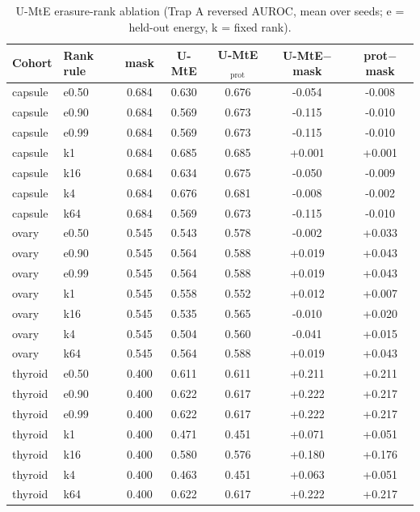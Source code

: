 \begin{table}[H]\centering\scriptsize
\caption{U-MtE erasure-rank ablation (Trap A reversed AUROC, mean over seeds; e = held-out energy, k = fixed rank).}\label{tab:abl}
\begin{tabular}{llccccc}\toprule
Cohort & Rank rule & mask & U-MtE & U-MtE$_{\text{prot}}$ & U-MtE$-$mask & prot$-$mask \\\midrule
capsule & e0.50 & 0.684 & 0.630 & 0.676 & -0.054 & -0.008 \\
capsule & e0.90 & 0.684 & 0.569 & 0.673 & -0.115 & -0.010 \\
capsule & e0.99 & 0.684 & 0.569 & 0.673 & -0.115 & -0.010 \\
capsule & k1 & 0.684 & 0.685 & 0.685 & +0.001 & +0.001 \\
capsule & k16 & 0.684 & 0.634 & 0.675 & -0.050 & -0.009 \\
capsule & k4 & 0.684 & 0.676 & 0.681 & -0.008 & -0.002 \\
capsule & k64 & 0.684 & 0.569 & 0.673 & -0.115 & -0.010 \\
ovary & e0.50 & 0.545 & 0.543 & 0.578 & -0.002 & +0.033 \\
ovary & e0.90 & 0.545 & 0.564 & 0.588 & +0.019 & +0.043 \\
ovary & e0.99 & 0.545 & 0.564 & 0.588 & +0.019 & +0.043 \\
ovary & k1 & 0.545 & 0.558 & 0.552 & +0.012 & +0.007 \\
ovary & k16 & 0.545 & 0.535 & 0.565 & -0.010 & +0.020 \\
ovary & k4 & 0.545 & 0.504 & 0.560 & -0.041 & +0.015 \\
ovary & k64 & 0.545 & 0.564 & 0.588 & +0.019 & +0.043 \\
thyroid & e0.50 & 0.400 & 0.611 & 0.611 & +0.211 & +0.211 \\
thyroid & e0.90 & 0.400 & 0.622 & 0.617 & +0.222 & +0.217 \\
thyroid & e0.99 & 0.400 & 0.622 & 0.617 & +0.222 & +0.217 \\
thyroid & k1 & 0.400 & 0.471 & 0.451 & +0.071 & +0.051 \\
thyroid & k16 & 0.400 & 0.580 & 0.576 & +0.180 & +0.176 \\
thyroid & k4 & 0.400 & 0.463 & 0.451 & +0.063 & +0.051 \\
thyroid & k64 & 0.400 & 0.622 & 0.617 & +0.222 & +0.217 \\
\bottomrule\end{tabular}\end{table}
